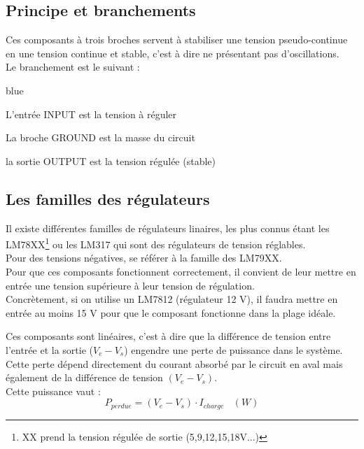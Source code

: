   \subsection{Principe et branchements}
  Ces composants à trois broches servent à stabiliser une tension pseudo-continue en une tension continue et stable, c'est à dire ne présentant pas d'oscillations.\\


  Le branchement est le suivant : \\


  \begin{items}{blue}{\Triangle}
    \item L'entrée INPUT est la tension à réguler
    \item La broche GROUND est la masse du circuit
    \item la sortie OUTPUT est la tension régulée (stable)
\end{items}

\subsection{Les familles des régulateurs}

  Il existe différentes familles de régulateurs linaires, les plus connus étant les LM78XX\footnote{XX prend la tension régulée de sortie (5,9,12,15,18V...)} ou les LM317 qui sont des régulateurs de tension réglables.\\
  Pour des tensions négatives, se référer à la famille des LM79XX.\\

  Pour que ces composants fonctionnent correctement, il convient de leur mettre en entrée une tension supérieure à leur tension de régulation.\\

  Concrètement, si on utilise un LM7812 (régulateur 12 V), il faudra mettre en entrée au moins 15 V pour que le composant fonctionne dans la plage idéale.\\


  Ces composants sont linéaires, c'est à dire que la différence de tension entre l'entrée et la sortie ($V_{e}-V_s$) 
  engendre une perte de puissance dans le système.\\
  Cette perte dépend directement du courant absorbé par le circuit en aval mais également de la différence de tension $(V_e-V_s)$.\\
  Cette puissance vaut : $$ P_{perdue} =(V_e-V_s)\cdot I_{charge} ~~~~(W)$$

